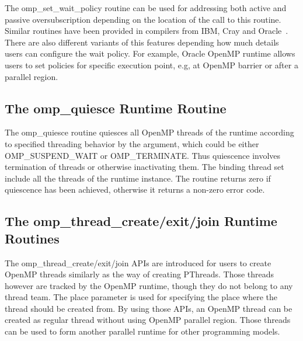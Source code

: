 The {\sf omp\_set\_wait\_policy} routine can be used for addressing both active and passive oversubscription depending on
the location of the call to this routine. Similar routines have been provided in compilers from IBM, Cray and 
Oracle~\cite{ibmwait,craywait,oraclewait}.
There are also different variants of this features depending how much details users can configure
the wait policy. For example, Oracle OpenMP runtime allows users to set policies for specific execution point, e.g, at OpenMP 
barrier or after a {\sf parallel} region. 

\subsection{The {\sf omp\_quiesce} Runtime Routine}
The {\sf omp\_quiesce} routine quiesces all OpenMP threads of the runtime according to 
specified threading behavior by the argument, which could be either {\sf OMP\_SUSPEND\_WAIT} or {\sf OMP\_TERMINATE}. 
Thus quiescence involves termination of threads or otherwise inactivating them. 
The binding thread set include all the threads of the runtime instance. 
The routine returns zero if quiescence has been achieved, otherwise it returns a non-zero error code.



\subsection{The {\sf omp\_thread\_create/exit/join} Runtime Routines}

The {\sf omp\_thread\_create/exit/join} APIs are introduced for users to create OpenMP threads similarly as the way of creating
PThreads. Those threads however are tracked by the OpenMP runtime, though they do not belong to any thread team. 
The {\sf place} parameter is used for specifying the place where the thread should be created from.  
By using those APIs, an OpenMP thread can be created as regular thread without using OpenMP {\sf parallel} region. 
Those threads can be used to form another parallel runtime for other programming
models. 



